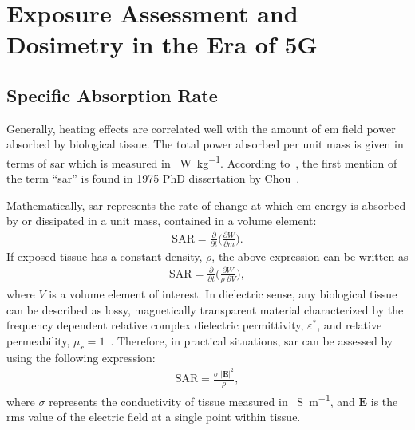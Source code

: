 \chapter{Exposure Assessment and Dosimetry in the Era of 5G}
\label{chap:methods}

\section{Specific Absorption Rate}
Generally, heating effects are correlated well with the amount of \gls{em} field power absorbed by biological tissue.
The total power absorbed per unit mass is given in terms of \gls{sar} which is measured in \SI{}{\watt\per\kg}.
According to~\cite{Foster2022Three}, the first mention of the term ``\gls{sar}'' is found in 1975 PhD dissertation by Chou~\cite{Chou1975Effects}.

Mathematically, \gls{sar} represents the rate of change at which \gls{em} energy is absorbed by or dissipated in a unit mass, contained in a volume element:
\begin{align}
    \label{eqn:sar_1}
    \text{SAR} = \frac{\partial}{\partial t} \Big( \frac{\partial W}{\partial m} \Big).
\end{align}
If exposed tissue has a constant density, $\rho$, the above expression can be written as
\begin{align}
    \label{eqn:sar_2}
    \text{SAR} = \frac{\partial}{\partial t} \Big( \frac{\partial W}{\rho \; \partial V} \Big),
\end{align}
where $V$ is a volume element of interest.
In dielectric sense, any biological tissue can be described as lossy, magnetically transparent material characterized by the frequency dependent relative complex dielectric permittivity,  $\varepsilon^*$, and relative permeability, $\mu_r = 1$~\cite{Sasaki2014Measurement}.
Therefore, in practical situations, \gls{sar} can be assessed by using the following expression:
\begin{align}
    \label{eqn:sar_3}
    \text{SAR} = \frac{\sigma \; |\mathbf{E}|^2}{\rho},
\end{align}
where $\sigma$ represents the conductivity of tissue measured in \SI{}{\siemens\per\m}, and $\mathbf{E}$ is the \gls{rms} value of the electric field at a single point within tissue.

